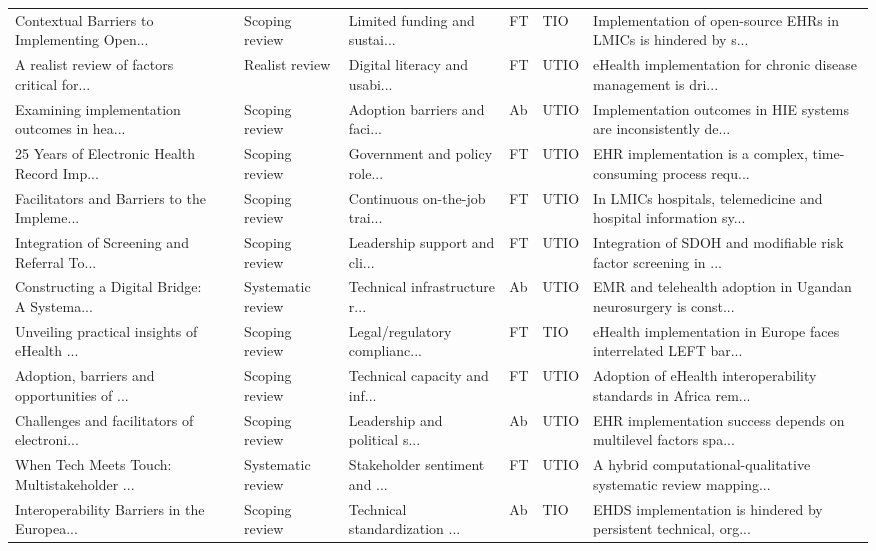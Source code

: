\begin{longtable}{p{3.4cm} >{\centering\arraybackslash}p{0.7cm} p{1.9cm} p{2.4cm} >{\centering\arraybackslash}p{0.8cm} >{\centering\arraybackslash}p{1.1cm} p{3.4cm}}
Contextual Barriers to Implementing Open... & 2024 & Scoping review & Limited funding and sustai... & FT & TIO & Implementation of open-source EHRs in LMICs is hindered by s... \\
A realist review of factors critical for... & 2025 & Realist review & Digital literacy and usabi... & FT & UTIO & eHealth implementation for chronic disease management is dri... \\
Examining implementation outcomes in hea... & 2025 & Scoping review & Adoption barriers and faci... & Ab & UTIO & Implementation outcomes in HIE systems are inconsistently de... \\
25 Years of Electronic Health Record Imp... & 2025 & Scoping review & Government and policy role... & FT & UTIO & EHR implementation is a complex, time-consuming process requ... \\
Facilitators and Barriers to the Impleme... & 2025 & Scoping review & Continuous on-the-job trai... & FT & UTIO & In LMICs hospitals, telemedicine and hospital information sy... \\
Integration of Screening and Referral To... & 2025 & Scoping review & Leadership support and cli... & FT & UTIO & Integration of SDOH and modifiable risk factor screening in ... \\
Constructing a Digital Bridge: A Systema... & 2025 & Systematic review & Technical infrastructure r... & Ab & UTIO & EMR and telehealth adoption in Ugandan neurosurgery is const... \\
Unveiling practical insights of eHealth ... & 2025 & Scoping review & Legal/regulatory complianc... & FT & TIO & eHealth implementation in Europe faces interrelated LEFT bar... \\
Adoption, barriers and opportunities of ... & 2026 & Scoping review & Technical capacity and inf... & FT & UTIO & Adoption of eHealth interoperability standards in Africa rem... \\
Challenges and facilitators of electroni... & 2026 & Scoping review & Leadership and political s... & Ab & UTIO & EHR implementation success depends on multilevel factors spa... \\
When Tech Meets Touch: Multistakeholder ... & 2026 & Systematic review & Stakeholder sentiment and ... & FT & UTIO & A hybrid computational-qualitative systematic review mapping... \\
Interoperability Barriers in the Europea... & 2026 & Scoping review & Technical standardization ... & Ab & TIO & EHDS implementation is hindered by persistent technical, org... \\

\end{longtable}
